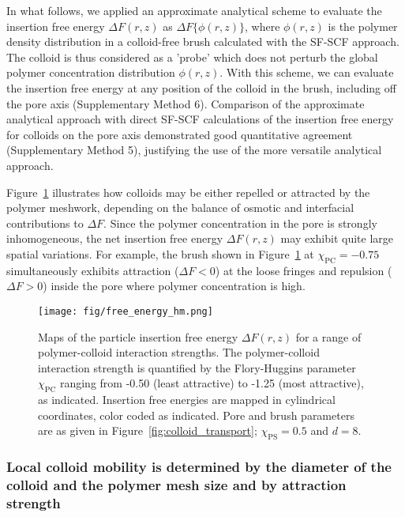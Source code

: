 \documentclass[12pt, a4paper]{article}
\begin{document}
In what follows, we applied an approximate analytical scheme to evaluate the insertion free energy $\Delta F(r,z)$ as $\Delta F\{\phi(r,z)\}$, where $\phi(r,z)$ is the polymer density distribution in a colloid-free brush calculated with the SF-SCF approach.
The colloid is thus considered as a 'probe' which does not perturb the global polymer concentration distribution $\phi(r,z)$.
With this scheme, we can evaluate the insertion free energy at any position of the colloid in the brush, including off the pore axis (Supplementary Method 6).
Comparison of the approximate analytical approach with direct SF-SCF calculations of the insertion free energy for colloids on the pore axis demonstrated good quantitative agreement (Supplementary Method 5), justifying the use of the more versatile analytical approach.

Figure~\ref{fig:DeltaF_map} illustrates how colloids may be either repelled or attracted by the polymer meshwork, depending on the balance of osmotic and interfacial contributions to $\Delta F$.
Since the polymer concentration in the pore is strongly inhomogeneous, the net insertion free energy $\Delta F(r,z)$ may exhibit quite large spatial variations.
For example, the brush shown in Figure~\ref{fig:DeltaF_map} at $\chi_{\text{PC}}=-0.75$ simultaneously exhibits attraction ($\Delta F<0$) at the loose fringes and repulsion ($\Delta F>0$) inside the pore where polymer concentration is high.

\begin{figure}
    \centering
    \texttt{[image: fig/free\_energy\_hm.png]}
    \caption{
    Maps of the particle insertion free energy $\Delta F(r,z)$ for a range of polymer-colloid interaction strengths.
    The polymer-colloid interaction strength is quantified by the Flory-Huggins parameter $\chi_{\text{PC}}$ ranging from -0.50 (least attractive) to -1.25 (most attractive), as indicated.
    Insertion free energies are mapped in cylindrical coordinates, color coded as indicated.
    Pore and brush parameters are as given in Figure~\ref{fig:colloid_transport}; $\chi_{\text{PS}}=0.5$ and $d=8$.
    }
    \label{fig:DeltaF_map}
\end{figure}


\subsubsection{Local colloid mobility is determined by the diameter of the colloid and the polymer mesh size and by attraction strength}
\end{document}
